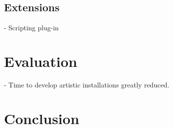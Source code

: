 \documentclass{sigchi}
\begin{document}

\subsection{Extensions}
- Scripting plug-in

\section{Evaluation}
- Time to develop artistic installations greatly reduced.

\section{Conclusion}
\end{document}
